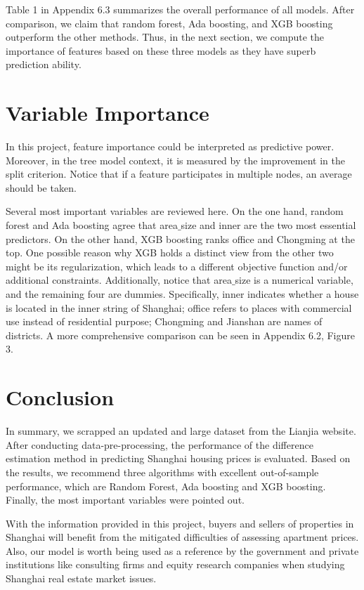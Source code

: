 \documentclass[11pt,a4paper]{article}
\begin{document}
 Table 1 in Appendix 6.3 summarizes the overall performance of all models. After comparison, we claim that random forest, Ada boosting, and XGB boosting outperform the other methods. Thus, in the next section, we compute the importance of features based on these three models as they have superb prediction ability.
 \section{Variable Importance}
 In this project, feature importance could be interpreted as predictive power. Moreover, in the tree model context, it is measured by the improvement in the split criterion. Notice that if a feature participates in multiple nodes, an average should be taken.

Several most important variables are reviewed here. On the one hand, random forest and Ada boosting agree that area$\_$size and inner are the two most essential predictors. On the other hand, XGB boosting ranks office and Chongming at the top. One possible reason why XGB holds a distinct view from the other two might be its regularization, which leads to a different objective function and/or additional constraints. Additionally, notice that area$\_$size is a numerical variable, and the remaining four are dummies. Specifically, inner indicates whether a house is located in the inner string of Shanghai; office refers to places with commercial use instead of residential purpose; Chongming and Jianshan are names of districts. A more comprehensive comparison can be seen in Appendix 6.2, Figure 3.
\section{Conclusion}
In summary, we scrapped an updated and large dataset from the Lianjia website. After conducting data-pre-processing, the performance of the difference estimation method in predicting Shanghai housing prices is evaluated. Based on the results, we recommend three algorithms with excellent out-of-sample performance, which are Random Forest, Ada boosting and XGB boosting. Finally, the most important variables were pointed out. 

With the information provided in this project, buyers and sellers of properties in Shanghai will benefit from the mitigated difficulties of assessing apartment prices. Also, our model is worth being used as a reference by the government and private institutions like consulting firms and equity research companies when studying Shanghai real estate market issues.
 
\end{document}
